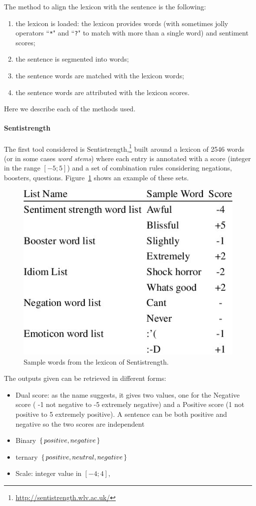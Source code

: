 The method to align the lexicon with the sentence is the following:
\begin{enumerate}
    \item the lexicon is loaded: the lexicon provides words (with sometimes jolly operators ``\texttt{*}" and ``\texttt{?}" to match with more than a single word) and sentiment scores;
    \item the sentence is segmented into words;
    \item the sentence words are matched with the lexicon words;
    \item the sentence words are attributed with the lexicon scores.
\end{enumerate}

Here we describe each of the methods used.

\paragraph{Sentistrength}
The first tool considered is Sentistrength,\footnote{\url{http://sentistrength.wlv.ac.uk/}} built around a lexicon of 2546 words (or in some cases \emph{word stems}) where each entry is annotated with a score (integer in the range $[-5;5]$) and a set of combination rules considering negations, boosters, questions.
Figure~\ref{fig:sentistrength_example} shows an example of these sets.

\begin{figure}[!htbp]
    \centering
    \includegraphics[width=0.5\linewidth]{figures/sentistrength_example.jpg}
    \caption{Sample words from the lexicon of Sentistrength.}
    \label{fig:sentistrength_example}
\end{figure}

The outputs given can be retrieved in different forms:
\begin{itemize}
    \item Dual score: as the name suggests, it gives two values, one for the Negative score ( -1 not negative to -5 extremely negative) and a Positive score (1 not positive to 5 extremely positive). A sentence can be both positive and negative so the two scores are independent
    \item Binary $\set{positive, negative}$
    \item ternary $\set{positive, neutral, negative}$
    \item Scale: integer value in $[-4;4]$,
\end{itemize}


